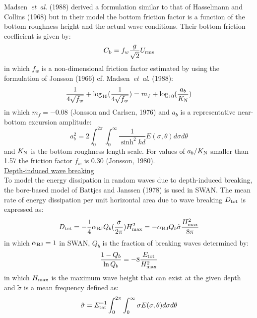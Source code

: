 \documentclass[12pt]{book}
\begin{document}
Madsen~{\it et~al}. (1988) derived a formulation similar to that of Hasselmann and Collins (1968) but in their
model the bottom friction factor is a function of the bottom roughness height and the actual wave
conditions. Their bottom friction coefficient is given by:
\begin{equation}
  C_{\rm b} = f_w \frac{g}{\sqrt{2}} U_{\rm rms}
  \label{eq3-19}
\end{equation}
in which $f_w$ is a non-dimensional friction factor estimated by using the formulation of Jonsson (1966) cf.
Madsen~{\it et~al}. (1988):
\begin{equation}
  \frac{1}{4\sqrt{f_w}} + \log_{10} (\frac{1}{4\sqrt{f_w}}) = m_f + \log_{10} (\frac{a_b}{K_{\rm N}})
  \label{eq3-20}
\end{equation}
in which $m_f = -0.08$ (Jonsson and Carlsen, 1976) and $a_b$ is a representative near-bottom excursion
amplitude:
\begin{equation}
  a^2_{b} = 2\int_{0}^{2\pi} \int_{0}^{\infty} \frac{1}{\sinh^2 kd} E(\sigma,\theta) d\sigma d\theta
  \label{eq3-21}
\end{equation}
and $K_{\rm N}$ is the bottom roughness length scale. For values of $a_b/K_{\rm N}$ smaller than 1.57 the
friction factor $f_w$ is 0.30 (Jonsson, 1980).
\nocite{Jon76C,Jon80}
\\[2ex]
\noindent
\underline{Depth-induced wave breaking}\\[2ex]
To model the energy dissipation in random waves due to depth-induced breaking, the bore-based model
of Battjes and Janssen (1978) is used in SWAN. The mean rate of energy dissipation per unit horizontal
area due to wave breaking $D_{\rm tot}$ is expressed as:
\begin{equation}
  D_{\rm tot} = - \frac{1}{4} \alpha_{\rm BJ} Q_b (\frac{\tilde{\sigma}}{2\pi}) H^2_{\rm max}
              = - \alpha_{\rm BJ} Q_b \tilde{\sigma} \frac{H^2_{\rm max}}{8\pi}
  \label{eq3-22}
\end{equation}
in which $\alpha_{\rm BJ} = 1$ in SWAN, $Q_b$ is the fraction of breaking waves determined by:
\begin{equation}
  \frac{1 - Q_b}{\ln Q_b} = -8 \frac{E_{\rm tot}}{H_{\rm max}^2}
  \label{eq3-23}
\end{equation}
in which $H_{\rm max}$ is the maximum wave height that can exist at the given depth and ${\tilde{\sigma}}$
is a mean frequency defined as:
\begin{equation}
  \tilde{\sigma} = E^{-1}_{\rm tot} \int_{0}^{2\pi} \int_{0}^{\infty} \sigma E(\sigma,\theta) d\sigma d\theta
  \label{eq3-24}
\end{equation}
\end{document}
